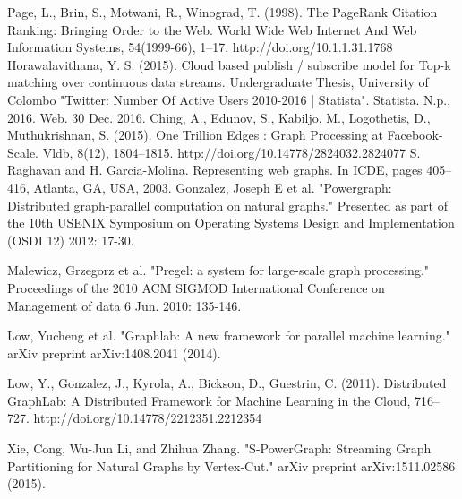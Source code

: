 \documentclass[conference]{IEEEtran}
\begin{document}
%
%
%
\begin{thebibliography}{1}

   Page, L., Brin, S., Motwani, R.,  Winograd, T. (1998). The PageRank Citation Ranking: Bringing Order to the Web. World Wide Web Internet And Web Information Systems, 54(1999-66), 1–17. http://doi.org/10.1.1.31.1768
   Horawalavithana, Y. S. (2015). Cloud based publish / subscribe model for Top-k matching over continuous data streams. Undergraduate Thesis, University of Colombo
   "Twitter: Number Of Active Users 2010-2016 | Statista". Statista. N.p., 2016. Web. 30 Dec. 2016.
   Ching, A., Edunov, S., Kabiljo, M., Logothetis, D.,  Muthukrishnan, S. (2015). One Trillion Edges : Graph Processing at Facebook-Scale. Vldb, 8(12), 1804–1815. http://doi.org/10.14778/2824032.2824077
   S. Raghavan and H. Garcia-Molina. Representing web graphs. In ICDE, pages 405–416, Atlanta, GA, USA, 2003.
   Gonzalez, Joseph E et al. "Powergraph: Distributed graph-parallel computation on natural graphs." Presented as part of the 10th USENIX Symposium on Operating Systems Design and Implementation (OSDI 12) 2012: 17-30.

    Malewicz, Grzegorz et al. "Pregel: a system for large-scale graph processing." Proceedings of the 2010 ACM SIGMOD International Conference on Management of data 6 Jun. 2010: 135-146.

   Low, Yucheng et al. "Graphlab: A new framework for parallel machine learning." arXiv preprint arXiv:1408.2041 (2014).
  
   Low, Y., Gonzalez, J., Kyrola, A., Bickson, D.,  Guestrin, C. (2011). Distributed GraphLab: A Distributed Framework for Machine Learning in the Cloud, 716–727. http://doi.org/10.14778/2212351.2212354
  
   Xie, Cong, Wu-Jun Li, and Zhihua Zhang. "S-PowerGraph: Streaming Graph Partitioning for Natural Graphs by Vertex-Cut." arXiv preprint arXiv:1511.02586 (2015).
  

\end{thebibliography}
\end{document}
